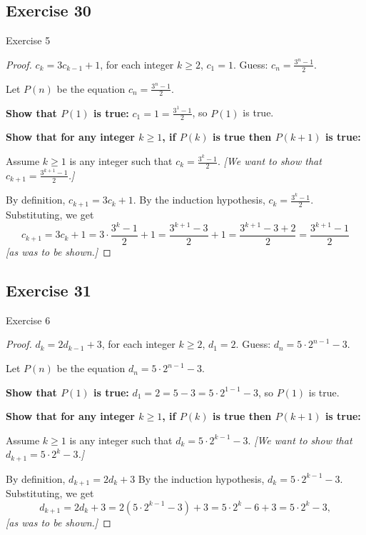 \documentclass[14pt]{extarticle}
\newcommand{\dps}{\displaystyle}
\begin{document}
\subsection{Exercise 30}
Exercise 5

\begin{proof}
    \(c_k = 3c_{k-1} + 1\), for each integer \(k \geq 2\), \(c_1 = 1\). Guess: \(\dps c_n = \frac{3^n - 1}{2}\).

    Let $P(n)$ be the equation \(\dps c_n = \frac{3^n - 1}{2}\).

        {\bf Show that \(P(1)\) is true:} \(\dps c_1 = 1 = \frac{3^1 - 1}{2}\), so $P(1)$ is true.

        {\bf Show that for any integer \(k \geq 1\), if \(P(k)\) is true then \(P(k+1)\) is true:}

    Assume \(k \geq 1\) is any integer such that \(\dps c_k = \frac{3^k - 1}{2}\).
        {\it [We want to show that \(\dps c_{k+1} = \frac{3^{k+1} - 1}{2}\).]}

    By definition, \(c_{k+1} = 3c_k + 1\).
    By the induction hypothesis, \(\dps c_k = \frac{3^k - 1}{2}\).
    Substituting, we get
    \[
        c_{k+1} = 3c_k + 1 = 3 \cdot \frac{3^k - 1}{2} + 1 = \frac{3^{k+1} - 3}{2} + 1
        = \frac{3^{k+1} - 3 + 2}{2} = \frac{3^{k+1} - 1}{2}
    \]
    {\it [as was to be shown.]}
\end{proof}

\subsection{Exercise 31}
Exercise 6

\begin{proof}
    \(d_k = 2d_{k-1} + 3\), for each integer \(k \geq 2\), \(d_1 = 2\). Guess: \(\dps d_n = 5 \cdot 2^{n-1} - 3\).

    Let $P(n)$ be the equation \(\dps d_n = 5 \cdot 2^{n-1} - 3\).

        {\bf Show that \(P(1)\) is true:} \(\dps d_1 = 2 = 5 - 3 = 5 \cdot 2^{1-1} - 3\), so $P(1)$ is true.

        {\bf Show that for any integer \(k \geq 1\), if \(P(k)\) is true then \(P(k+1)\) is true:}

    Assume \(k \geq 1\) is any integer such that \(\dps d_k = 5 \cdot 2^{k-1} - 3\).
        {\it [We want to show that \(\dps d_{k+1} = 5 \cdot 2^k - 3\).]}

    By definition, \(d_{k+1} = 2d_k + 3\)
    By the induction hypothesis, \(d_k = 5 \cdot 2^{k-1} - 3\).
    Substituting, we get
    \[
        d_{k+1} = 2d_k + 3 = 2(5 \cdot 2^{k-1} - 3) + 3 = 5 \cdot 2^k - 6 + 3 = 5 \cdot 2^k - 3,
    \]
    {\it [as was to be shown.]}
\end{proof}
\end{document}
